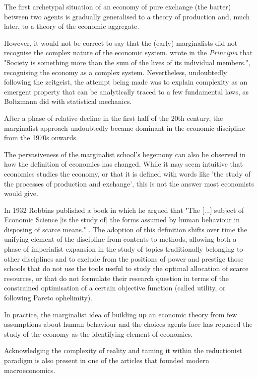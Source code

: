 \documentclass[a4paper, headings=standardclasses]{scrartcl}
\begin{document}
The first archetypal situation of an economy of pure exchange (the barter) between two agents is gradually generalised to a theory of production and, much later, to a theory of the economic aggregate.

However, it would not be correct to say that the (early) marginalists did not recognise the complex nature of the economic system.
\textcite[p. 20]{marshall1988} wrote in the \textit{Principia} that "Society is something more than the sum of the lives of its individual members.", recognising the economy as a complex system.
Nevertheless, undoubtedly following the zeitgeist, the attempt being made was to explain complexity as an emergent property that can be analytically traced to a few fundamental laws, as Boltzmann did with statistical mechanics.

After a phase of relative decline in the first half of the 20th century, the marginalist approach undoubtedly became dominant in the economic discipline from the 1970s onwards. 

The pervasiveness of the marginalist school's hegemony can also be observed in how the definition of economics has changed. 
While it may seem intuitive that economics studies the economy, or that it is defined with words like 'the study of the processes of production and exchange', this is not the answer most economists would give.

In 1932 Robbins published a book in which he argued that "The [...] subject of Economic Science [is the study of] the forms assumed by human behaviour in disposing of scarce means." \parencite[p. 15]{robbins2007}.
The adoption of this definition shifts over time the unifying element of the discipline from contents to methods, allowing both a phase of imperialist expansion in the study of topics traditionally belonging to other disciplines \parencite[cf.][]{stigler1984, lazear2000} and to exclude from the positions of power and prestige those schools that do not use the tools useful to study the optimal allocation of scarce resources, or that do not formulate their research question in terms of the constrained optimisation of a certain objective function (called utility, or following Pareto ophelimity).

In practice, the marginalist idea of building up an economic theory from few assumptions about human behaviour and the choices agents face has replaced the study of the economy as the identifying element of economics.

Acknowledging the complexity of reality and taming it within the reductionist paradigm is also present in one of the articles that founded modern macroeconomics.
\end{document}
